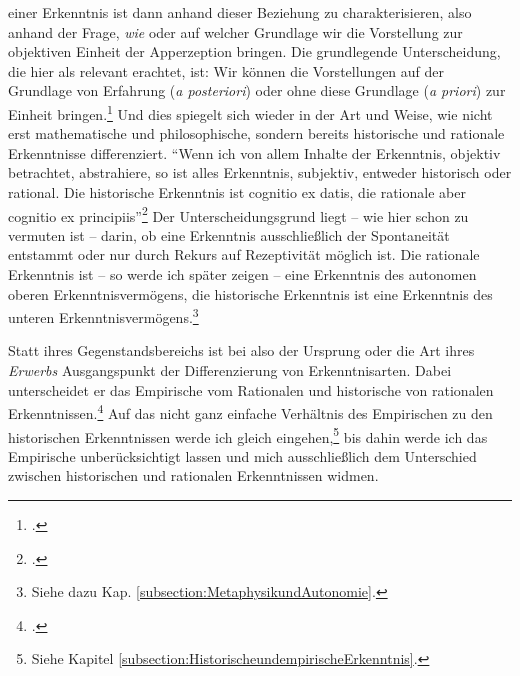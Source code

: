 einer Erkenntnis ist dann anhand dieser Beziehung zu charakterisieren, also
anhand der Frage, \emph{wie} oder auf welcher Grundlage wir die Vorstellung zur
objektiven Einheit der Apperzeption bringen. Die grundlegende Unterscheidung, die 
hier als relevant erachtet, ist: Wir können die Vorstellungen auf der Grundlage
von Erfahrung (\emph{a posteriori}) oder ohne diese Grundlage (\emph{a priori}) zur
Einheit bringen.\footnote{\cite[Vgl.][B
12\,f.,]{Kant:KritikderreinenVernunft2003}
\cite[][III: 35.1--36.5]{Kant:GesammelteWerke1900ff.}.} Und dies spiegelt sich
wieder in der Art und Weise, wie  nicht erst mathematische
und philosophische, sondern bereits historische und rationale Erkenntnisse
differenziert. \enquote{Wenn ich von allem Inhalte
der Erkenntnis, objektiv betrachtet, abstrahiere, so ist alles Erkenntnis,
subjektiv, entweder historisch oder rational. Die historische Erkenntnis ist
cognitio ex datis, die rationale aber cognitio ex
principiis}\footnote{\cite[][B~863\,f.,]{Kant:KritikderreinenVernunft2003}
\cite[][III: 540.30--33]{Kant:GesammelteWerke1900ff.}.} Der Unterscheidungsgrund
liegt -- wie hier schon zu vermuten ist -- darin, ob eine Erkenntnis
ausschließlich der Spontaneität entstammt oder nur durch Rekurs auf Rezeptivität
möglich ist. Die rationale Erkenntnis ist -- so werde ich später zeigen -- eine
Erkenntnis des autonomen oberen Erkenntnisvermögens, die historische Erkenntnis
ist eine Erkenntnis des unteren Erkenntnisvermögens.\footnote{Siehe
dazu Kap. \ref{subsection:MetaphysikundAutonomie}.}




Statt ihres Gegenstandsbereichs ist bei  also der Ursprung
oder die Art ihres \emph{Erwerbs} Ausgangspunkt der Differenzierung von
Erkenntnisarten. Dabei unterscheidet er das Empirische vom
Rationalen und historische von rationalen Erkenntnissen.\footnote{\cite[Vgl.][B
863\,f.,]{Kant:KritikderreinenVernunft2003} \cite[][III:
540.27--33]{Kant:GesammelteWerke1900ff.}.} Auf das nicht ganz einfache
Verhältnis des Empirischen zu den historischen Erkenntnissen werde ich gleich
eingehen,\footnote{Siehe Kapitel
\ref{subsection:HistorischeundempirischeErkenntnis}.} bis dahin werde ich das
Empirische unberücksichtigt lassen und mich ausschließlich dem Unterschied
zwischen historischen und rationalen Erkenntnissen widmen.


